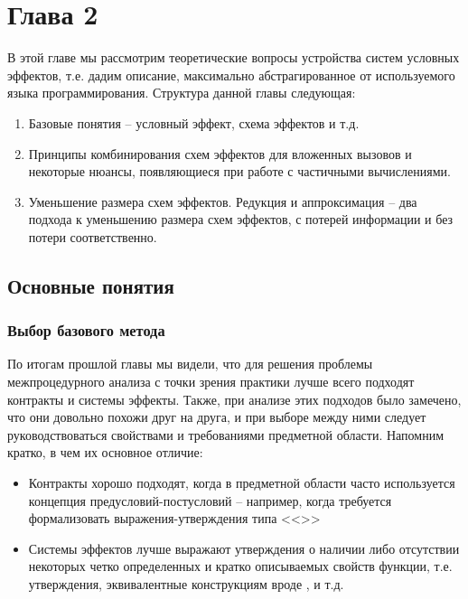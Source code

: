\section{Глава 2}

В этой главе мы рассмотрим теоретические вопросы устройства систем условных эффектов, т.е. дадим описание, максимально абстрагированное от используемого языка программирования. Структура данной главы следующая:

\begin{enumerate}
    \item Базовые понятия -- условный эффект, схема эффектов и т.д.
    
    \item Принципы комбинирования схем эффектов для вложенных вызовов и некоторые нюансы, появляющиеся при работе с частичными вычислениями.
    
    \item Уменьшение размера схем эффектов. Редукция и аппроксимация -- два подхода к уменьшению размера схем эффектов, с потерей информации и без потери соответственно.
    
\end{enumerate}

\subsection{Основные понятия}

\subsubsection{Выбор базового метода}
По итогам прошлой главы мы видели, что для решения проблемы межпроцедурного анализа с точки зрения практики лучше всего подходят контракты и системы эффекты. Также, при анализе этих подходов было замечено, что они довольно похожи друг на друга, и при выборе между ними следует руководствоваться свойствами и требованиями предметной области. Напомним кратко, в чем их основное отличие:

\begin{itemize}
    \item Контракты хорошо подходят, когда в предметной области часто используется концепция предусловий-постусловий --  например, когда требуется формализовать выражения-утверждения типа <<>>

    \item Системы эффектов лучше выражают утверждения о наличии либо отсутствии некоторых четко определенных и кратко описываемых свойств функции, т.е. утверждения, эквивалентные конструкциям вроде ,  и т.д.

\end{itemize}

